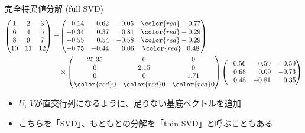 \begin{frame}[t,fragile]{完全特異値分解 (full SVD)}
  \[
  \begin{split}
    \begin{pmatrix}
      1 & 2 & 3 \\
      6 & 4 & 5 \\
      8 & 9 & 7 \\
      10 & 11 & 12
    \end{pmatrix} =&
    \begin{pmatrix}
      -0.14 & -0.62 & -0.05 & {\color{red} -0.77} \\
      -0.34 & \ \ \,0.37 & \ \ \,0.81 & {\color{red} -0.29} \\
      -0.55 & \ \ \,0.54 & -0.58 & {\color{red} -0.29} \\
      -0.75 & -0.44 & \ \ \,0.06 & {\color{red} \ \ \,0.48}
    \end{pmatrix} \\
    &\times
    \begin{pmatrix}
      25.35 & 0 & 0 \\
      0 & 2.15 & 0 \\
      0 & 0 & 1.71 \\
      {\color{red} 0} & {\color{red} 0} & {\color{red} 0}
    \end{pmatrix}
    \begin{pmatrix}
      -0.56 & -0.59 & -0.59 \\
      \ \ \,0.68 & \ \ \,0.09 & -0.73 \\
      \ \ \,0.48 & -0.81 & \ \ \,0.35
    \end{pmatrix}
  \end{split}
  \]
  \begin{itemize}
  \item $U$, $V$が直交行列になるように、足りない基底ベクトルを追加
  \item こちらを「SVD」、もともとの分解を「thin SVD」と呼ぶこともある
  \end{itemize}
\end{frame}

